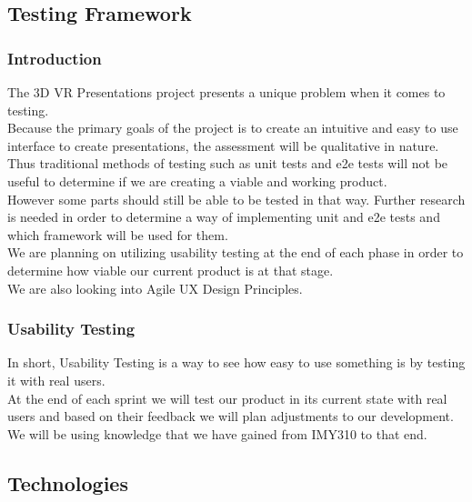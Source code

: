 \documentclass{article}
\begin{document}
\newpage

\subsection{Testing Framework}
	\subsubsection{Introduction}
		The 3D VR Presentations project presents a unique problem when it comes to testing.\\
		Because the primary goals of the project is to create an intuitive and easy to use interface to create presentations,
		the assessment will be qualitative in nature.\\
		Thus traditional methods of testing such as unit tests and e2e tests will not be useful to determine if we are creating a viable and working product.\\
		However some parts should still be able to be tested in that way. Further research is needed in order to determine a way of implementing unit and e2e tests and which framework will be used for them.\\
		We are planning on utilizing usability testing at the end of each phase in order to determine how viable our current product is at that stage.\\
		We are also looking into Agile UX Design Principles.

	\subsubsection{Usability Testing}
		In short, Usability Testing is a way to see how easy to use something is by testing it with real users.\\
		At the end of each sprint we will test our product in its current state with real users and based on their feedback we will plan adjustments to our development.
		We will be using knowledge that we have gained from IMY310 to that end.

\subsection{Technologies}
\end{document}
